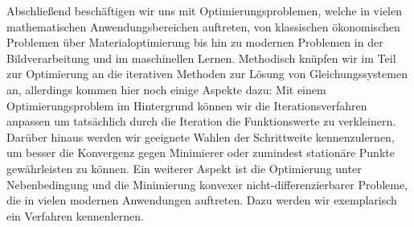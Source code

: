 Abschließend beschäftigen wir uns mit Optimierungsproblemen, welche in vielen mathematischen Anwendungsbereichen auftreten, von klassischen ökonomischen Problemen über Materialoptimierung bis hin zu modernen Problemen in der Bildverarbeitung und im maschinellen Lernen. 
Methodisch knüpfen wir im Teil zur Optimierung an die iterativen Methoden zur Lösung von Gleichungssystemen an, allerdings kommen hier noch einige Aspekte dazu: Mit einem Optimierungsproblem im Hintergrund können wir die Iterationsverfahren anpassen um tatsächlich durch die Iteration die Funktionswerte zu verkleinern. 
Darüber hinaus werden wir geeignete Wahlen der Schrittweite kennenzulernen, um besser die Konvergenz gegen Minimierer oder zumindest stationäre Punkte gewährleisten zu können. 
Ein weiterer Aspekt ist die Optimierung unter Nebenbedingung und die Minimierung konvexer nicht-differenzierbarer Probleme, die in vielen modernen Anwendungen auftreten. Dazu werden wir exemplarisch ein Verfahren kennenlernen.

